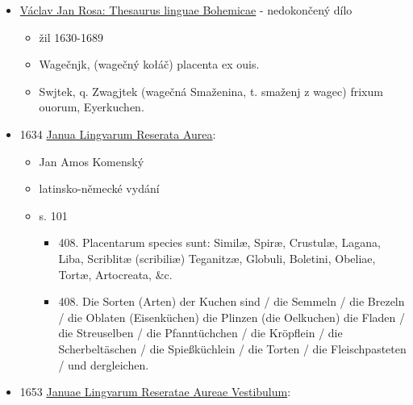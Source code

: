 \begin{itemize}
\begin{itemize}
\begin{itemize}
      \begin{itemize}
      \tightlist
      \item
        Naběračkou nanášet těsto po špejli a otáčet, aby se rovnoměrně
        rozprostřelo
      \item
        Nechat těsto částečně ztuhnout, znovu přilévat a opakovat
      \item
        Po dosažení tloušťky cca půl prstu ozdobit proužky skořice, tím
        koláč získá ostny
      \end{itemize}
    \item
      Pečení

      \begin{itemize}
      \tightlist
      \item
        Peče se nad žhavými uhlíky, ne přímo na plameni
      \item
        Po dopečení potřít máslem pro zlatavou barvu
      \end{itemize}
    \end{itemize}
  \end{itemize}
\item
  \href{https://bara.ujc.cas.cz/slovniky/rosa/rosafst1480.html}{Václav
  Jan Rosa: Thesaurus linguae Bohemicae} - nedokončený dílo

  \begin{itemize}
  \tightlist
  \item
    žil 1630-1689
  \item
    Wagečnjk, (wagečný kołáč) placenta ex ouis.
  \item
    Swjtek, q. Zwagjtek (wagečná Smaženina, t. smaženj z wagec) frixum
    ouorum, Eyerkuchen.
  \end{itemize}
\item
  1634
  \href{https://ceskadigitalniknihovna.cz/uuid/uuid:e8cd9396-bbda-47f7-aac7-3f4a843367f6}{Janua
  Lingvarum Reserata Aurea}:

  \begin{itemize}
  \tightlist
  \item
    Jan Amos Komenský
  \item
    latinsko-německé vydání
  \item
    s. 101

    \begin{itemize}
    \tightlist
    \item
      408. Placentarum species sunt: Similæ, Spiræ, Crustulæ, Lagana,
      Liba, Scriblitæ (scribiliæ) Teganitzæ, Globuli, Boletini, Obeliae,
      Tortæ, Artocreata, \&c.
    \item
      408. Die Sorten (Arten) der Kuchen sind / die Semmeln / die
      Brezeln / die Oblaten (Eisenküchen) die Plinzen (die Oelkuchen)
      die Fladen / die Streuselben / die Pfanntüchchen / die Kröpflein /
      die Scherbeltäschen / die Spießküchlein / die Torten / die
      Fleischpasteten / und dergleichen.
    \end{itemize}
  \end{itemize}
\item
  1653
  \href{https://ceskadigitalniknihovna.cz/uuid/uuid:849c5567-5ea1-4490-835d-eca31d9b479c}{Januae
  Lingvarum Reseratae Aureae Vestibulum}:


\end{itemize}
